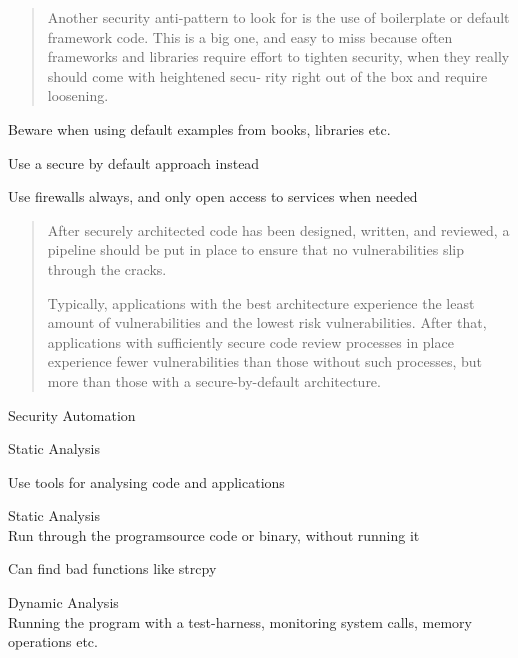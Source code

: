 \documentclass[Screen16to9,17pt]{foils}
\begin{document}


\begin{quote}
Another security anti-pattern to look for is the use of boilerplate or default framework
code. This is a big one, and easy to miss because often frameworks and libraries
require effort to tighten security, when they really should come with heightened secu‐
rity right out of the box and require loosening.
\end{quote}

\begin{list2}
\item Beware when using default examples from books, libraries etc.
\item Use a secure by default approach instead
\item Use firewalls always, and only open access to services when needed
\end{list2}





\begin{quote}
After securely architected code has been designed, written, and reviewed, a pipeline should be put in place to ensure that no vulnerabilities slip through the cracks.

Typically, applications with the best architecture experience the least amount of vulnerabilities and the lowest risk vulnerabilities. After that, applications with sufficiently secure code review processes in place experience fewer vulnerabilities than those without such processes, but more than those with a secure-by-default architecture.
\end{quote}

\begin{list2}
\item Security Automation
\item Static Analysis
\end{list2}





\centerline{Use tools for analysing code and applications}


\begin{list1}
\item  {\Large Static Analysis}\\
Run through the programsource  code or binary, without running it

Can find bad functions like strcpy

\item {\Large Dynamic Analysis }\\
Running the program with a test-harness, monitoring system calls, memory operations etc.
\end{list1}
\end{document}
